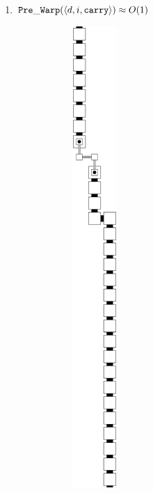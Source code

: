         \begin{enumerate}[label={--}]

            \item ${\tt Pre\_Warp}   (\langle d, i, {\tt carry}\rangle)\approx O(1)$
                \begin{figure}[h]
                    \centering
                    \begin{subfigure}[t]{0.2\textwidth}
                        \centering
                        \includegraphics[width=0.2\textwidth]{warping/pre_warp_general}

\end{subfigure}
\end{figure}
\end{enumerate}
